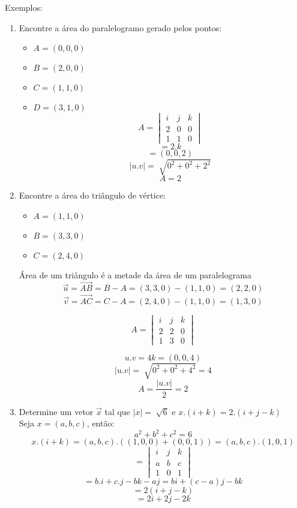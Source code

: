 \documentclass[ ]{article}
\begin{document}
			Exemplos:
			\begin{enumerate}
				\item Encontre a área do paralelogramo gerado pelos pontos:\\
				\begin{itemize}
					\item $A=(0,0,0)$
					\item $B=(2,0,0)$
					\item $C=(1,1,0)$
					\item $D=(3,1,0)$
$$				A=	\begin{vmatrix}
					       	i & j & k\\
						2 & 0 & 0\\
						1 & 1 & 0
					\end{vmatrix} $$
					$$=2.k$$
					$$= (0,0,2)$$
					$$|u.v| = \sqrt[]{0^2+0^2+2^2}$$
					$$A= 2$$%

				\end{itemize}
				\item Encontre a área do triângulo de vértice:\\
				\begin{itemize}
					\item $A=(1,1,0)$
					\item $B=(3,3,0)$
					\item $C=(2,4,0)$
				\end{itemize}
				Área de um triângulo é a metade da área de um paralelograma
				$$\overrightarrow{u}=\overrightarrow{AB}= B-A = (3,3,0)-(1,1,0)=(2,2,0)$$
				$$\overrightarrow{v}=\overrightarrow{AC} = C-A = (2,4,0)-(1,1,0)=(1,3,0)$$

				$$A = \begin{vmatrix}
					i&j&k\\
					2&2&0\\
					1&3&0
				\end{vmatrix}$$
				
				$$u.v=4k = (0,0,4)$$
				$$|u.v|=\sqrt[ ]{0^2+0^2+4^2}=4$$
				$$A = \dfrac{|u.v|}{2}=2$$
				\item Determine um vetor $\overrightarrow{x}$ tal que  $|x|=\sqrt[]{6}$ e $x.(i+k)=2.(i+j-k)$\\
				Seja $x = (a,b,c)$, então:
				$$a^2+b^2+c^2=6$$
				$$x.(i+k)=(a,b,c).((1,0,0)+(0,0,1)) = (a,b,c).(1,0,1)$$
				$$=\begin{vmatrix}
					i & j & k \\
					a &b &c\\
					1 &0 &1
				\end{vmatrix}$$
				$$=b.i+c.j-bk-aj=bi+(c-a)j-bk$$
				$$=2(i+j-k)$$
				$$=2i+2j-2k$$
				

\end{enumerate}
\end{document}
